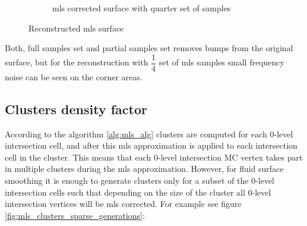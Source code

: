 \begin{figure}
\begin{center}
\begin{subfigure}[b]{\textwidth}
			\caption{mls corrected surface with quarter set of samples}
		\end{subfigure}
	\end{center}
	\caption{Reconstructed mls surface} \label{fig:surface_sampling_results}
\end{figure}
Both, full samples set and partial samples set removes bumps from the original surface, but for the reconstruction with $\dfrac{1}{4}$ set of mls samples small frequency noise can be seen on the corner areas.\\

\subsection{Clusters density factor}
According to the algorithm \ref{alg:mls_alg} clusters are computed for each 0-level intersection cell, and after this mls approximation is applied to each intersection cell in the cluster. This means that each 0-level intersection MC vertex takes part in multiple clusters during the mls approximation. However, for fluid surface smoothing it is enough to generate clusters only for a subset of the 0-level intersection cells such that depending on the size of the cluster all 0-level intersection vertices will be mls corrected. For example see figure \ref{fig:mls_clusters_sparse_generations}:

